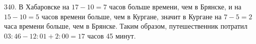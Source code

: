 340. В Хабаровске на $17-10=7$ часов больше времени, чем в Брянске, и на $15-10=5$ часов времени больше, чем в Кургане, значит в Кургане на $7-5=2$ часа времени больше, чем в Брянске. Таким образом, путешественник потратил
$03:46-12:01+2:00=17$ часов 45 минут.\\
